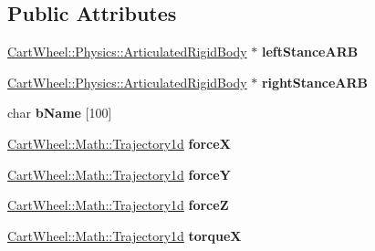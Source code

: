 \subsection*{Public Attributes}
\begin{DoxyCompactItemize}
\item 
\hypertarget{classCartWheel_1_1Core_1_1ExternalForce_a0951c56bbbfdd6b1b8b3a0dc4fb1317f}{
\hyperlink{classCartWheel_1_1Physics_1_1ArticulatedRigidBody}{CartWheel::Physics::ArticulatedRigidBody} $\ast$ {\bfseries leftStanceARB}}
\label{classCartWheel_1_1Core_1_1ExternalForce_a0951c56bbbfdd6b1b8b3a0dc4fb1317f}

\item 
\hypertarget{classCartWheel_1_1Core_1_1ExternalForce_ac0ccbeda8c779948a7b347e7b3e54ced}{
\hyperlink{classCartWheel_1_1Physics_1_1ArticulatedRigidBody}{CartWheel::Physics::ArticulatedRigidBody} $\ast$ {\bfseries rightStanceARB}}
\label{classCartWheel_1_1Core_1_1ExternalForce_ac0ccbeda8c779948a7b347e7b3e54ced}

\item 
\hypertarget{classCartWheel_1_1Core_1_1ExternalForce_a5d51033ef6764967a3afb19db58e1cff}{
char {\bfseries bName} \mbox{[}100\mbox{]}}
\label{classCartWheel_1_1Core_1_1ExternalForce_a5d51033ef6764967a3afb19db58e1cff}

\item 
\hypertarget{classCartWheel_1_1Core_1_1ExternalForce_a88d3dda2f70c1ef7380dfc4ba939e7da}{
\hyperlink{classCartWheel_1_1Math_1_1GenericTrajectory}{CartWheel::Math::Trajectory1d} {\bfseries forceX}}
\label{classCartWheel_1_1Core_1_1ExternalForce_a88d3dda2f70c1ef7380dfc4ba939e7da}

\item 
\hypertarget{classCartWheel_1_1Core_1_1ExternalForce_a4c237e1d81631dab41988859de8a6528}{
\hyperlink{classCartWheel_1_1Math_1_1GenericTrajectory}{CartWheel::Math::Trajectory1d} {\bfseries forceY}}
\label{classCartWheel_1_1Core_1_1ExternalForce_a4c237e1d81631dab41988859de8a6528}

\item 
\hypertarget{classCartWheel_1_1Core_1_1ExternalForce_aba5439fa4317a1aafb9c871445a3cc33}{
\hyperlink{classCartWheel_1_1Math_1_1GenericTrajectory}{CartWheel::Math::Trajectory1d} {\bfseries forceZ}}
\label{classCartWheel_1_1Core_1_1ExternalForce_aba5439fa4317a1aafb9c871445a3cc33}

\item 
\hypertarget{classCartWheel_1_1Core_1_1ExternalForce_aa5b4d67d0d0e7ace1b7efbef3935ef60}{
\hyperlink{classCartWheel_1_1Math_1_1GenericTrajectory}{CartWheel::Math::Trajectory1d} {\bfseries torqueX}}
\label{classCartWheel_1_1Core_1_1ExternalForce_aa5b4d67d0d0e7ace1b7efbef3935ef60}


\end{DoxyCompactItemize}
